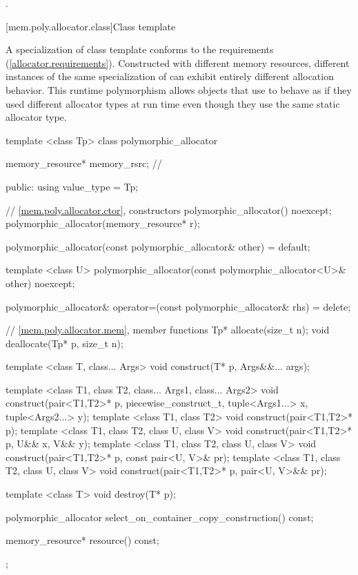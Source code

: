 \begin{itemdescr}
\pnum
\returns
{}.
\end{itemdescr}

[mem.poly.allocator.class]{Class template }

\pnum
A specialization of class template 
conforms to the  requirements (\ref{allocator.requirements}).
Constructed with different memory resources,
different instances of the same specialization of 
can exhibit entirely different allocation behavior.
This runtime polymorphism allows objects that use 
to behave as if they used different allocator types at run time
even though they use the same static allocator type.

%
\begin{codeblock}
template <class Tp>
class polymorphic_allocator {
  memory_resource* memory_rsrc; // \expos

public:
  using value_type = Tp;

  // \ref{mem.poly.allocator.ctor}, constructors
  polymorphic_allocator() noexcept;
  polymorphic_allocator(memory_resource* r);

  polymorphic_allocator(const polymorphic_allocator& other) = default;

  template <class U>
    polymorphic_allocator(const polymorphic_allocator<U>& other) noexcept;

  polymorphic_allocator&
    operator=(const polymorphic_allocator& rhs) = delete;

  // \ref{mem.poly.allocator.mem}, member functions
  Tp* allocate(size_t n);
  void deallocate(Tp* p, size_t n);

  template <class T, class... Args>
  void construct(T* p, Args&&... args);

  template <class T1, class T2, class... Args1, class... Args2>
    void construct(pair<T1,T2>* p, piecewise_construct_t,
                   tuple<Args1...> x, tuple<Args2...> y);
  template <class T1, class T2>
    void construct(pair<T1,T2>* p);
  template <class T1, class T2, class U, class V>
    void construct(pair<T1,T2>* p, U&& x, V&& y);
  template <class T1, class T2, class U, class V>
    void construct(pair<T1,T2>* p, const pair<U, V>& pr);
  template <class T1, class T2, class U, class V>
    void construct(pair<T1,T2>* p, pair<U, V>&& pr);

  template <class T>
    void destroy(T* p);

  polymorphic_allocator select_on_container_copy_construction() const;

  memory_resource* resource() const;
};
\end{codeblock}


